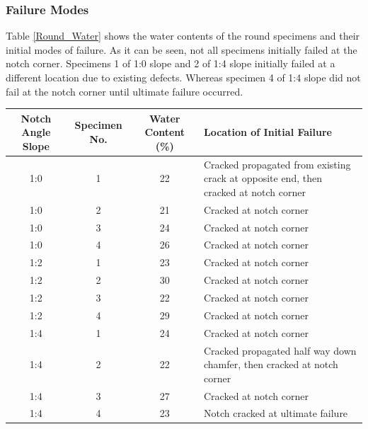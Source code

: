 \documentclass[11pt,a4paper]{article}
\numberwithin{equation}{subsection}
\begin{document}
\subsubsection{Failure Modes}
Table \ref{Round_Water} shows the water contents of the round specimens and their initial modes of failure. As it can be seen, not all specimens initially failed at the notch corner. Specimens 1 of 1:0 slope and 2 of 1:4 slope initially failed at a different location due to existing defects. Whereas specimen 4 of 1:4 slope did not fail at the notch corner until ultimate failure occurred. 

\pagebreak


	\begin{tabular}{|c|c|c|p{4.5cm}|} 
		\hline
		\textbf{Notch Angle Slope} & \textbf{Specimen No.} & \textbf{Water Content (\%)} & \textbf{Location of Initial Failure}\\ [0.5ex]
		\hline
		
		1:0 & 1 & 22 & Cracked propagated from existing crack at opposite end, then cracked at notch corner  \\ [0.5ex]
		\hline
		1:0 & 2 & 21 & Cracked at notch corner  \\ [0.5ex]
		\hline
		1:0 & 3 & 24 & Cracked at notch corner  \\ [0.5ex]
		\hline
		1:0 & 4 & 26 & Cracked at notch corner \\ [0.5ex]
		\hline
		
		1:2 & 1 & 23 & Cracked at notch corner \\ [0.5ex]
		\hline
		1:2 & 2 & 30 & Cracked at notch corner \\ [0.5ex]
		\hline
		1:2 & 3 & 22 & Cracked at notch corner \\ [0.5ex]
		\hline
		1:2 & 4 & 29 & Cracked at notch corner \\ [0.5ex]
		\hline
		
		1:4 & 1 & 24 & Cracked at notch corner \\ [0.5ex]
		\hline
		1:4 & 2 & 22 & Cracked propagated half way down chamfer, then cracked at notch corner \\ [0.5ex]
		\hline
		1:4 & 3 & 27 & Cracked at notch corner \\ [0.5ex]
		\hline
		1:4 & 4 & 23 & Notch cracked at ultimate failure \\ [0.5ex]
		\hline
		
	\end{tabular}
	\label{Round_Water}
\end{document}
